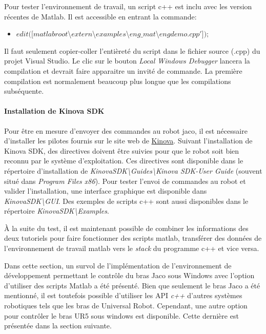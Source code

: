 Pour tester l'environnement de travail, un script c++ est inclu avec les version récentes de Matlab. 
Il est accessible en entrant la commande:
\begin{itemize}
\item $ edit([ matlabroot $\textbackslash$ extern$\textbackslash$ examples$\textbackslash$ eng\_mat$\textbackslash$ engdemo.cpp' ]);$
\end{itemize}

Il faut seulement copier-coller l'entièreté du script dans le fichier source (.cpp) du projet Visual Studio. Le clic sur le bouton \textit{Local Windows Debugger} lancera la compilation et devrait faire apparaitre un invité de commande. 
La première compilation est normalement beaucoup plus longue que les compilations subséquente.

\paragraph{Installation de Kinova SDK}
Pour être en mesure d'envoyer des commandes au robot jaco, il est nécessaire d'installer les pilotes fournis sur le site web de \href{https://drive.google.com/open?id=0B790iVm0vRTlRFNFRldIb2Jmbkk}{Kinova}.
Suivant l'installation de Kinova SDK, des directives doivent être suivies pour que le robot soit bien reconnu par le système d'exploitation.
Ces directives sont disponible dans le répertoire d'installation de \textit{KinovaSDK\textbackslash Guides\textbackslash Kinova SDK-User Guide} (souvent situé dans \textit{Program Files x86}).
Pour tester l'envoi de commandes au robot et valider l'installation, une interface graphique est disponible dans \textit{KinovaSDK\textbackslash GUI}.
Des exemples de scripts c++ sont aussi disponibles dans le répertoire \textit{KinovaSDK\textbackslash Examples}.


À la suite du test, il est maintenant possible de combiner les informations des deux tutoriels pour faire fonctionner des scripts matlab, transférer des données de l'environnement de travail matlab vers le \textit{stack} du programme c++ et vice versa.

Dans cette section, un survol de l'implémentation de l'environnement de développement permettant le contrôle du bras Jaco sous Windows avec l'option d'utiliser des scripts Matlab a été présenté.
Bien que seulement le bras Jaco a été mentionné, il est toutefois possible d'utiliser les API \textit{c++} d'autres systèmes robotiques tels que les bras de Universal Robot. 
Cependant, une autre option pour contrôler le bras UR5 sous windows est disponible.
Cette dernière est présentée dans la section suivante.


\newpage



















 